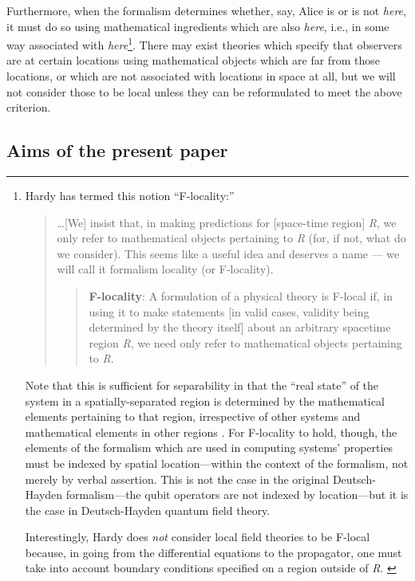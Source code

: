 \documentclass[12pt]{article}
\begin{document}
Furthermore, when the formalism determines whether, say, Alice is or is not {\em here}\/, it must
do so using mathematical ingredients which are also {\em here}\/, i.e., in some way associated with
 {\em here}\/\footnote{ 
Hardy \cite{Hardy08} has termed this notion ``F-locality:''
\begin{quote}
\ldots [We]  insist that, in making
predictions for [space-time region] {\em R}, we only refer to mathematical objects pertaining to {\em  R} (for, if
not, what do we consider). This seems like a useful idea and deserves a name ---
we will call it formalism locality (or F-locality).
\begin{quote}
{\bf F-locality}: A formulation of a physical theory is F-local if, in using
it to make statements [in valid cases, validity being determined
by the theory itself] about an
arbitrary spacetime region {\em R}, we need only refer to mathematical
objects pertaining to {\em R}.
\end{quote}
\end{quote}
Note that this is sufficient for separability in that the ``real state'' of the system in a spatially-separated region is determined by the mathematical elements pertaining to that region, irrespective of other systems and mathematical elements in other regions .  For F-locality to hold, though, the elements of the formalism which are used in computing systems’ properties must be indexed by spatial location---within the context of the formalism, not merely by verbal assertion.  This is not the case in the original Deutsch-Hayden formalism\cite{DeutschHayden00}---the qubit operators are not indexed by location---but it is the case in Deutsch-Hayden quantum field theory. 

Interestingly, Hardy does {\em not}\/ consider local field theories to be F-local because,
in going from the differential equations to the propagator, one must take into
account boundary conditions specified on a region outside of {\em R}\/. \label{Hardyfootnote}
}. There may exist theories which specify that observers are at certain locations using
mathematical objects which are far from those locations, or which are not associated with locations
in space at all, but we will  not consider those to be local unless they can be reformulated to
meet the above criterion. 


\subsection{Aims of the present paper}\label{SecAim}
\end{document}

